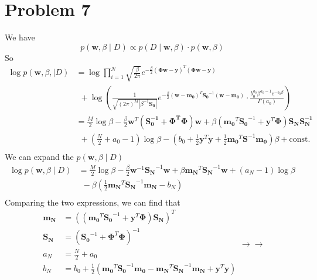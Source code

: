 \documentclass[12pt]{scrartcl}
\newcommand{\vect}[1]{\boldsymbol{#1}}
\newcommand{\ve}{\vect}
\begin{document}
  \section*{Problem 7}
  We have \[
  p\left( \ve{w}, \beta   \mid D \right) \propto p\left( D  \mid \ve{w}, \beta \right)  \cdot p\left( \ve{w}, \beta \right) 
  \] 
  So \[
      \begin{split}
          \log p\left( \ve{w}, \beta,  \mid D \right) &= \log \prod_{i=1}^{N} \sqrt{\frac{\beta}{2\pi}}e^{-\frac{\beta}{2}\left( \ve{\Phi w} - \ve{y} \right) ^{T}\left( \ve{\Phi w} - \ve{y} \right)  } \\ 
 &\ \ + \log \left( \frac{1}{\sqrt{\left( 2\pi \right) ^{M}|\beta^{-1}\ve{S_0} |} }e ^{-\frac{\beta}{2} \left( \ve{w} - \ve{m_0} \right)^{T} \ve{S_0}^{-1}\left(\ve{w} - \ve{m_0}\right) } \cdot \frac{b_0^{a_0}\beta^{a_0-1}e ^{-b_0\beta} }{\Gamma (a_0)}  \right)   \\
 &=  \frac{M}{2}\log\beta - \frac{\beta}{2}\ve{w}^{T}\left( \ve{S_0^{-1} + \ve{\Phi}^{T}\ve{\Phi}} \right) \ve{w} + \beta\left( \ve{m_0}^{T}\ve{S_0}^{-1}+\ve{y}^{T}\ve{\Phi}\right) \ve{S_NS_N^{-1}}    \\
 &\ \ + \left( \frac{N}{2} + a_0 - 1 \right) \log \beta - \left( b_0+\frac{1}{2}\ve{y}^{T}\ve{y} + \frac{1}{2}\ve{m_0}^{T}\ve{S}^{-1}\ve{m_0} \right) \beta + \text{const}. \\
      \end{split}
      \]
We can expand the $p\left( \ve{w}, \beta  \mid D \right) $\[
    \begin{split}
        \log p\left( \ve{w}, \beta  \mid  D \right) &= \frac{M}{2}\log \beta - \frac{\beta}{2}\ve{w}^{-1}\ve{S_N}^{-1}\ve{w} + \beta \ve{m_N}^{T}\ve{S_N}^{-1}\ve{w}+ \left( a_N - 1 \right)\log \beta \\ 
&\ \ - \beta\left( \frac{1}{2}\ve{m_N}^{T}\ve{S_N}^{-1}\ve{m_N} - b_N \right) \\ 
    \end{split}
\] 
    Comparing the two expressions, we can find that \[
        \begin{split}
            \ve{m_N} &= \left( \left( \ve{m_0}^{T}\ve{S_0}^{-1} + \ve{y}^{T}\ve{\Phi} \right) \ve{S_N} \right) ^{T} \\ 
            \ve{S_N} &= \left( \ve{S_0}^{-1}+\ve{\Phi}^{T}\ve{\Phi} \right) ^{-1} \\
            a_N &= \frac{N}{2}+a_0 \\
            b_N &= b_0+ \frac{1}{2}\left( \ve{m_0}^{T}\ve{S_0}^{-1}\ve{m_0} - \ve{m_N}^{T}\ve{S_N}^{-1}\ve{m_N} + \ve{y}^{T}\ve{y}  \right)\\
        \end{split}
        \to  \to 
        \]
\end{document}
